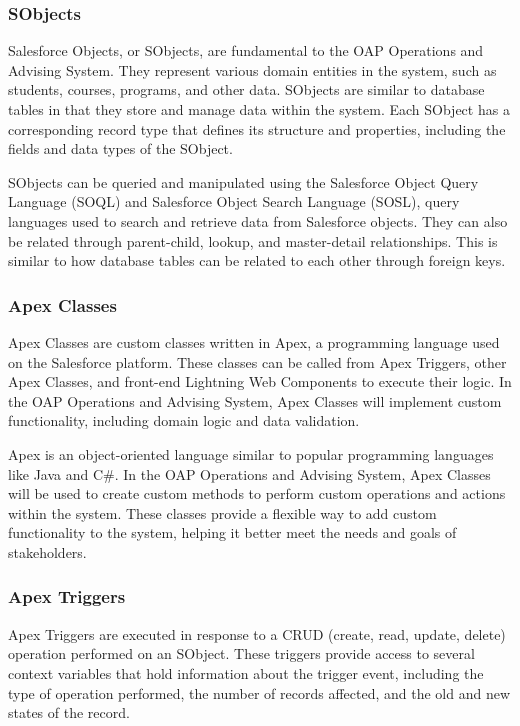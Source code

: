 \documentclass[12pt]{article}
\begin{document}
\subsubsection{SObjects}
Salesforce Objects, or SObjects, are fundamental to the OAP Operations and Advising System. They represent various domain entities in the system, such as students, courses, programs, and other data. SObjects are similar to database tables in that they store and manage data within the system. Each SObject has a corresponding record type that defines its structure and properties, including the fields and data types of the SObject.

SObjects can be queried and manipulated using the Salesforce Object Query Language (SOQL) and Salesforce Object Search Language (SOSL), query languages used to search and retrieve data from Salesforce objects. They can also be related through parent-child, lookup, and master-detail relationships. This is similar to how database tables can be related to each other through foreign keys.

\subsubsection{Apex Classes}
Apex Classes are custom classes written in Apex, a programming language used on the Salesforce platform. These classes can be called from Apex Triggers, other Apex Classes, and front-end Lightning Web Components to execute their logic. In the OAP Operations and Advising System, Apex Classes will implement custom functionality, including domain logic and data validation.

Apex is an object-oriented language similar to popular programming languages like Java and C\#. In the OAP Operations and Advising System, Apex Classes will be used to create custom methods to perform custom operations and actions within the system. These classes provide a flexible way to add custom functionality to the system, helping it better meet the needs and goals of stakeholders.

\subsubsection{Apex Triggers}
Apex Triggers are executed in response to a CRUD (create, read, update, delete) operation performed on an SObject. These triggers provide access to several context variables that hold information about the trigger event, including the type of operation performed, the number of records affected, and the old and new states of the record.
\end{document}
